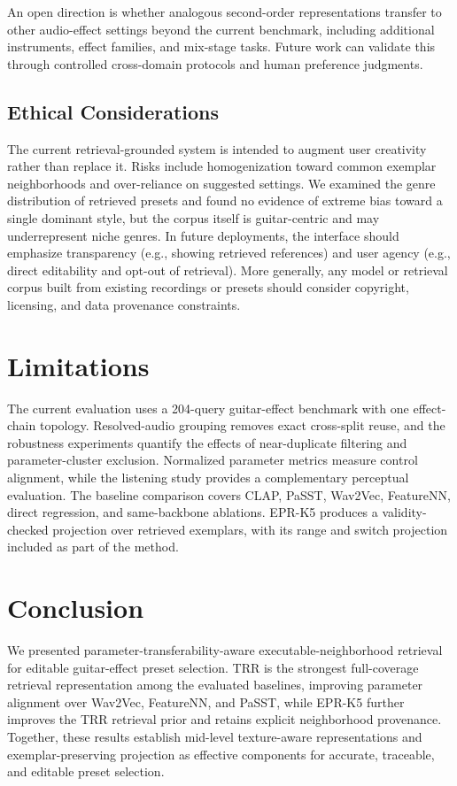 An open direction is whether analogous second-order representations transfer to other audio-effect settings beyond the current benchmark, including additional instruments, effect families, and mix-stage tasks. Future work can validate this through controlled cross-domain protocols and human preference judgments.

\subsection{Ethical Considerations}

The current retrieval-grounded system is intended to augment user creativity rather than replace it. Risks include homogenization toward common exemplar neighborhoods and over-reliance on suggested settings. We examined the genre distribution of retrieved presets and found no evidence of extreme bias toward a single dominant style, but the corpus itself is guitar-centric and may underrepresent niche genres. In future deployments, the interface should emphasize transparency (e.g., showing retrieved references) and user agency (e.g., direct editability and opt-out of retrieval). More generally, any model or retrieval corpus built from existing recordings or presets should consider copyright, licensing, and data provenance constraints.

\section{Limitations}
\label{sec:limitations}

The current evaluation uses a 204-query guitar-effect benchmark with one effect-chain topology. Resolved-audio grouping removes exact cross-split reuse, and the robustness experiments quantify the effects of near-duplicate filtering and parameter-cluster exclusion. Normalized parameter metrics measure control alignment, while the listening study provides a complementary perceptual evaluation. The baseline comparison covers CLAP, PaSST, Wav2Vec, FeatureNN, direct regression, and same-backbone ablations. EPR-K5 produces a validity-checked projection over retrieved exemplars, with its range and switch projection included as part of the method.

\section{Conclusion}
\label{sec:conclusion}

We presented parameter-transferability-aware executable-neighborhood retrieval for editable guitar-effect preset selection. TRR is the strongest full-coverage retrieval representation among the evaluated baselines, improving parameter alignment over Wav2Vec, FeatureNN, and PaSST, while EPR-K5 further improves the TRR retrieval prior and retains explicit neighborhood provenance. Together, these results establish mid-level texture-aware representations and exemplar-preserving projection as effective components for accurate, traceable, and editable preset selection.

